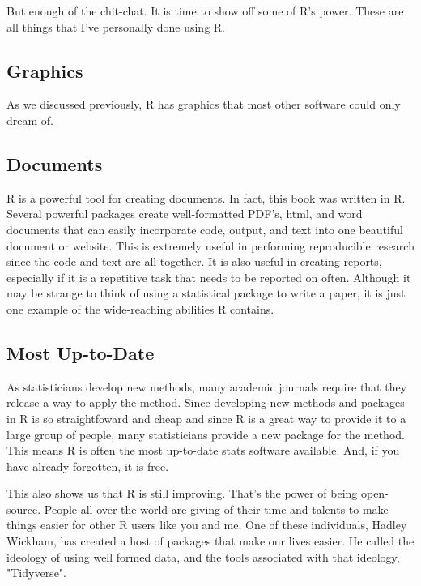 \documentclass{book}
\begin{document}
But enough of the chit-chat. It is time to show off some of R's power. These are all things that I've personally done using R.

\subsection*{Graphics}

As we discussed previously, R has graphics that most other software could only dream of.



\subsection*{Documents}

R is a powerful tool for creating documents. In fact, this book was written in R. Several powerful packages create well-formatted PDF's, html, and word documents that can easily incorporate code, output, and text into one beautiful document or website. This is extremely useful in performing reproducible research since the code and text are all together. It is also useful in creating reports, especially if it is a repetitive task that needs to be reported on often. Although it may be strange to think of using a statistical package to write a paper, it is just one example of the wide-reaching abilities R contains.

\subsection*{Most Up-to-Date}

As statisticians develop new methods, many academic journals require that they release a way to apply the method. Since developing new methods and packages in R is so straightfoward and cheap and since R is a great way to provide it to a large group of people, many statisticians provide a new package for the method. This means R is often the most up-to-date stats software available. And, if you have already forgotten, it is free.

This also shows us that R is still improving. That's the power of being open-source. People all over the world are giving of their time and talents to make things easier for other R users like you and me. One of these individuals, Hadley Wickham, has created a host of packages that make our lives easier. He called the ideology of using well formed data, and the tools associated with that ideology, "Tidyverse".
\end{document}
